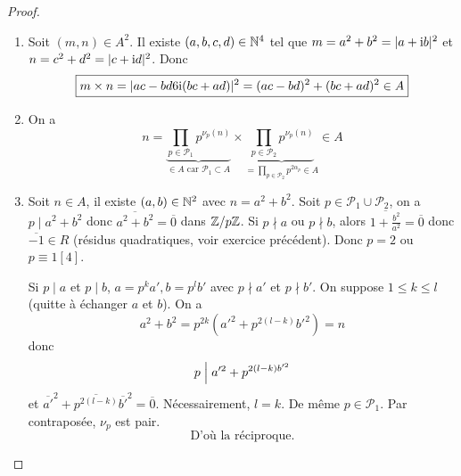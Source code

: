 \documentclass[12pt]{article}
\begin{document}
\begin{proof}
	\phantom{}
	\begin{enumerate}
		\item Soit $(m,n)\in A^{2}$. Il existe $(a,b,c,d)\in\mathbb{N}^{4}$ tel que $m=a^{2}+b^{2}=\vert a+\mathrm{i} b\vert^{2}$ et $n=c^{2}+d^{2}=\vert c+\mathrm{i} d\vert^{2}$. Donc 
		\begin{equation}
			\boxed{m\times n=\vert ac-bd6\mathrm{i}(bc+ad)\vert^{2}=(ac-bd)^{2}+(bc+ad)^{2}\in A}
		\end{equation}
		\item On a 
		\begin{equation}
			\boxed{n=\underbrace{\prod_{p\in\mathcal{P}_{1}}p^{\nu_{p}(n)}}_{\in A\text{ car }\mathcal{P}_{1}\subset A}\times\underbrace{\prod_{p\in\mathcal{P}_{2}}p^{\nu_{p}(n)}}_{=\prod_{p\in\mathcal{P}_{2}}p^{2\alpha_{p}}\in A}\in A}
		\end{equation}

		\item Soit $n\in A$, il existe $(a,b)\in\mathbb{N}^{2}$ avec $n=a^{2}+b^{2}$. Soit $p\in \mathcal{P}_{1}\cup\mathcal{P}_{2}$, on a $p\mid a^{2}+b^{2}$ donc $\overline{a^{2}+b^{2}}=\overline{0}$ dans $\mathbb{Z}/p\mathbb{Z}$. Si $p\nmid a$ ou $p\nmid b$, alors $\overline{1+\frac{b^{2}}{a^{2}}}=\overline{0}$ donc $\overline{-1}\in R$ (résidus quadratiques, voir exercice précédent). Donc $p=2$ ou $p\equiv 1[4]$.
		
		Si $p\mid a$ et $p\mid b$, $a=p^{k}a', b=p^{l}b'$ avec $p\nmid a'$ et $p\nmid b'$. On suppose $1\leqslant k\leqslant l$ (quitte à échanger $a$ et $b$).
		On a 
		\begin{equation}
			a^{2}+b^{2}=p^{2k}(a'^{2}+p^{2(l-k)}b'^{2})=n
		\end{equation}
		donc 
		\begin{equation}
			p\Bigm| a'^{2}+p^{2(l-k)b'^{2}}
		\end{equation}
		et $\overline{a'}^{2}+\overline{p^{2(l-k)}}\overline{b'}^{2}=\overline{0}$. Nécessairement, $l=k$. De même $p\in\mathcal{P}_{1}$. Par contraposée, $\nu_{p}$ est pair.
		\begin{equation}
			\boxed{\text{D'où la réciproque.}}
		\end{equation}
	\end{enumerate}
\end{proof}
\end{document}
